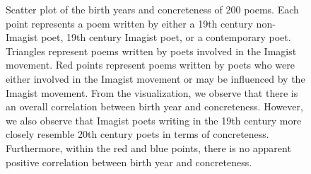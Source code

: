 \documentclass{book}
\begin{document}
\begin{figure}
\caption{Scatter plot of the birth years and concreteness of 200 poems. Each point represents a poem written by either a 19th century non-Imagist poet, 19th century Imagist poet, or a contemporary poet. Triangles represent poems written by poets involved in the Imagist movement. Red points represent poems written by poets who were either involved in the Imagist movement or may be influenced by the Imagist movement. From the visualization, we observe that there is an overall correlation between birth year and concreteness. However, we also observe that Imagist poets writing in the 19th century more closely resemble 20th century poets in terms of concreteness. Furthermore, within the red and blue points, there is no apparent positive correlation between birth year and concreteness.} 
\label{fig2}
\end{figure}
\end{document}
